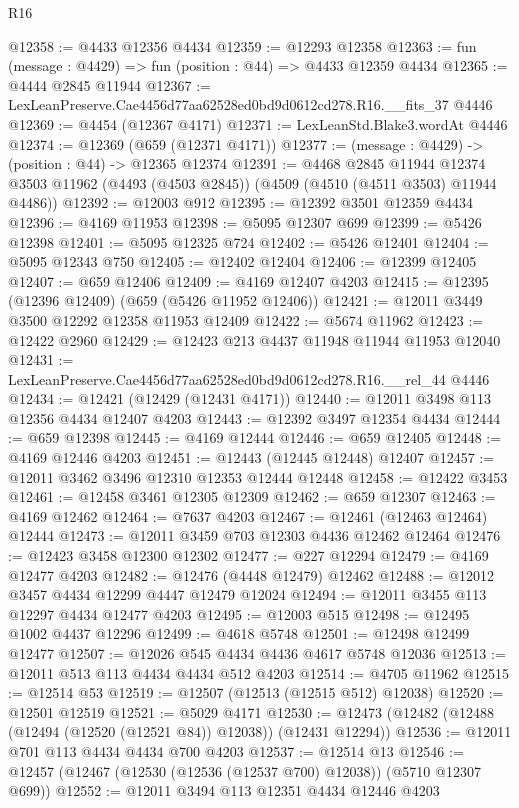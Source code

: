 \begin{lexlean}{R16}
\begin{coremodule}
@12358 := @4433 @12356 @4434
@12359 := @12293 @12358
@12363 := fun (message : @4429) => fun (position : @44) => @4433 @12359 @4434
@12365 := @4444 @2845 @11944
@12367 := LexLeanPreserve.Cae4456d77aa62528ed0bd9d0612cd278.R16.__fits_37 @4446
@12369 := @4454 (@12367 @4171)
@12371 := LexLeanStd.Blake3.wordAt @4446
@12374 := @12369 (@659 (@12371 @4171))
@12377 := (message : @4429) -> (position : @44) -> @12365 @12374
@12391 := @4468
    @2845
    @11944
    @12374
    @3503
    @11962
    (@4493 (@4503 @2845))
    (@4509 (@4510 (@4511 @3503) @11944 @4486))
@12392 := @12003 @912
@12395 := @12392 @3501 @12359 @4434
@12396 := @4169 @11953
@12398 := @5095 @12307 @699
@12399 := @5426 @12398
@12401 := @5095 @12325 @724
@12402 := @5426 @12401
@12404 := @5095 @12343 @750
@12405 := @12402 @12404
@12406 := @12399 @12405
@12407 := @659 @12406
@12409 := @4169 @12407 @4203
@12415 := @12395 (@12396 @12409) (@659 (@5426 @11952 @12406))
@12421 := @12011 @3449 @3500 @12292 @12358 @11953 @12409
@12422 := @5674 @11962
@12423 := @12422 @2960
@12429 := @12423 @213 @4437 @11948 @11944 @11953 @12040
@12431 := LexLeanPreserve.Cae4456d77aa62528ed0bd9d0612cd278.R16.__rel_44 @4446
@12434 := @12421 (@12429 (@12431 @4171))
@12440 := @12011 @3498 @113 @12356 @4434 @12407 @4203
@12443 := @12392 @3497 @12354 @4434
@12444 := @659 @12398
@12445 := @4169 @12444
@12446 := @659 @12405
@12448 := @4169 @12446 @4203
@12451 := @12443 (@12445 @12448) @12407
@12457 := @12011 @3462 @3496 @12310 @12353 @12444 @12448
@12458 := @12422 @3453
@12461 := @12458 @3461 @12305 @12309
@12462 := @659 @12307
@12463 := @4169 @12462
@12464 := @7637 @4203
@12467 := @12461 (@12463 @12464) @12444
@12473 := @12011 @3459 @703 @12303 @4436 @12462 @12464
@12476 := @12423 @3458 @12300 @12302
@12477 := @227 @12294
@12479 := @4169 @12477 @4203
@12482 := @12476 (@4448 @12479) @12462
@12488 := @12012 @3457 @4434 @12299 @4447 @12479 @12024
@12494 := @12011 @3455 @113 @12297 @4434 @12477 @4203
@12495 := @12003 @515
@12498 := @12495 @1002 @4437 @12296
@12499 := @4618 @5748
@12501 := @12498 @12499 @12477
@12507 := @12026 @545 @4434 @4436 @4617 @5748 @12036
@12513 := @12011 @513 @113 @4434 @4434 @512 @4203
@12514 := @4705 @11962
@12515 := @12514 @53
@12519 := @12507 (@12513 (@12515 @512) @12038)
@12520 := @12501 @12519
@12521 := @5029 @4171
@12530 := @12473 (@12482 (@12488 (@12494 (@12520 (@12521 @84)) @12038)) (@12431 @12294))
@12536 := @12011 @701 @113 @4434 @4434 @700 @4203
@12537 := @12514 @13
@12546 := @12457 (@12467 (@12530 (@12536 (@12537 @700) @12038)) (@5710 @12307 @699))
@12552 := @12011 @3494 @113 @12351 @4434 @12446 @4203

\end{coremodule}
\end{lexlean}
